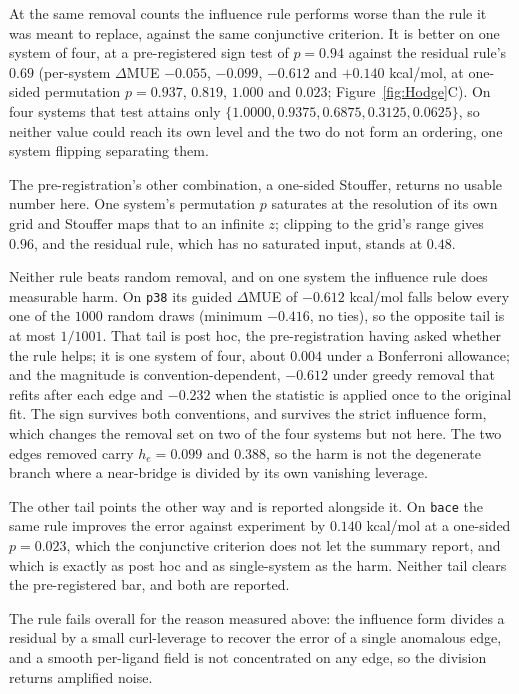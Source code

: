 At the same removal counts the influence rule performs worse than the rule it was meant to replace,
against the same conjunctive criterion. It is better on one system of four, at a pre-registered
sign test of $p=0.94$ against the residual rule's $0.69$ (per-system $\Delta$MUE $-0.055$,
$-0.099$, $-0.612$ and $+0.140$ kcal/mol, at one-sided permutation $p=0.937$, $0.819$, $1.000$
and $0.023$; Figure~\ref{fig:Hodge}C). On four systems that test attains only
$\{1.0000,0.9375,0.6875,0.3125,0.0625\}$, so neither value could reach its own level and the two do
not form an ordering, one system flipping separating them.

The pre-registration's other combination, a one-sided Stouffer, returns no usable number here. One
system's permutation $p$ saturates at the resolution of its own grid and Stouffer maps that to an
infinite $z$; clipping to the grid's range gives $0.96$, and the residual rule, which has no
saturated input, stands at $0.48$.

Neither rule beats random removal, and on one system the influence rule does measurable harm. On
\texttt{p38} its guided $\Delta$MUE of $-0.612$ kcal/mol falls below every one of the $1000$ random
draws (minimum $-0.416$, no ties), so the opposite tail is at most $1/1001$. That tail is post hoc,
the pre-registration having asked whether the rule helps; it is one system of four, about $0.004$
under a Bonferroni allowance; and the magnitude is convention-dependent, $-0.612$ under greedy
removal that refits after each edge and $-0.232$ when the statistic is applied once to the original
fit. The sign survives both conventions, and survives the strict influence form, which changes the
removal set on two of the four systems but not here. The two edges removed carry $h_e=0.099$ and
$0.388$, so the harm is not the degenerate branch where a near-bridge is divided by its own
vanishing leverage.

The other tail points the other way and is reported alongside it. On \texttt{bace} the same rule
improves the error against experiment by $0.140$ kcal/mol at a one-sided $p=0.023$, which the
conjunctive criterion does not let the summary report, and which is exactly as post hoc and as
single-system as the harm. Neither tail clears the pre-registered bar, and both are reported.

The rule fails overall for the reason measured above: the influence form divides a residual by a
small curl-leverage to recover the error of a single anomalous edge, and a smooth per-ligand field
is not concentrated on any edge, so the division returns amplified noise.

